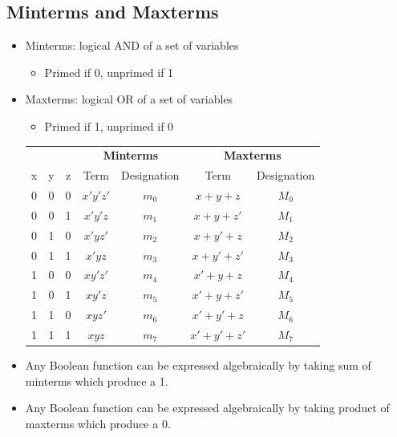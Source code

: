 \documentclass[a4paper]{article}
\begin{document}
\newpage
\subsection{Minterms and Maxterms}
\begin{itemize}
    \item Minterms: logical AND of a set of variables
    \begin{itemize}[label=$\circ$]
        \item Primed if 0, unprimed if 1
    \end{itemize}
    \item Maxterms: logical OR of a set of variables
    \begin{itemize}[label=$\circ$]
        \item Primed if 1, unprimed if 0
    \end{itemize}
\begin{table}[H]
\centering
\begin{tabular}{ccccccc}
 &  &  & \multicolumn{2}{c}{\textbf{Minterms}} & \multicolumn{2}{c}{\textbf{Maxterms}} \\
x & y & z & Term & Designation & Term & Designation \\
\hline
0 & 0 & 0 & $x'y'z'$ & $m_0$ & $x + y + z$ & $M_0$ \\
0 & 0 & 1 & $x'y'z$ & $m_1$ & $x + y + z'$ & $M_1$ \\
0 & 1 & 0 & $x'yz'$ & $m_2$ & $x + y' + z$ & $M_2$ \\
0 & 1 & 1 & $x'yz$ & $m_3$ & $x + y' + z'$ & $M_3$ \\
1 & 0 & 0 & $xy'z'$ & $m_4$ & $x' + y + z$ & $M_4$ \\
1 & 0 & 1 & $xy'z$ & $m_5$ & $x' + y + z'$ & $M_5$ \\
1 & 1 & 0 & $xyz'$ & $m_6$ & $x' + y' + z$ & $M_6$ \\
1 & 1 & 1 & $xyz$ & $m_7$ & $x' + y' + z'$ & $M_7$
\end{tabular}
\end{table}
\item Any Boolean function can be expressed algebraically by taking sum of minterms which produce a 1.
\item Any Boolean function can be expressed algebraically by taking product of maxterms which produce a 0.
\end{itemize}
\end{document}
